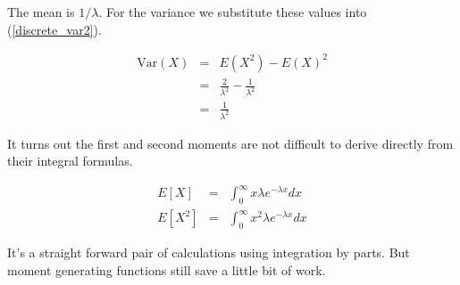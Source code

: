\documentclass[]{article}
\begin{document}
The mean is $1 / \lambda$.  For the variance we
substitute these values into (\ref{discrete_var2}).

\begin{eqnarray}
\mbox{Var}(X) & = & E(X^2) - E(X)^2 \nonumber \\
   & = & \frac{2}{\lambda^2} - \frac{1}{\lambda^2} \nonumber \\
   & = & \frac{1}{\lambda^2} \label{poisson_var}
\end{eqnarray}

It turns out the first and second moments are not difficult
to derive directly from their integral formulas.

\begin{eqnarray*}
E[X] & = & \int_0^{\infty} x \lambda e^{-\lambda x} dx \\
E[X^2] & = & \int_0^{\infty} x^2 \lambda e^{-\lambda x} dx
\end{eqnarray*}

It's a straight forward pair of calculations using integration
by parts. But moment generating functions still save a little
bit of work.
\end{document}
